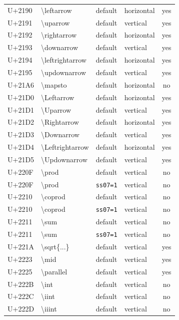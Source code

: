 \documentclass[10pt]{article}
\newcommand\feat[1]{\texttt{#1}}
\begin{document}
\begin{longtable}{>{\ttfamily}l>{\ttfamily}lllc}
U+2190 & \textbackslash{}leftarrow & default & horizontal & yes \\
U+2191 & \textbackslash{}uparrow & default & vertical & yes \\
U+2192 & \textbackslash{}rightarrow & default & horizontal & yes \\
U+2193 & \textbackslash{}downarrow & default & vertical & yes \\
U+2194 & \textbackslash{}leftrightarrow & default & horizontal & yes \\
U+2195 & \textbackslash{}updownarrow & default & vertical & yes \\
U+21A6 & \textbackslash{}mapsto & default & horizontal & no \\
U+21D0 & \textbackslash{}Leftarrow & default & horizontal & yes \\
U+21D1 & \textbackslash{}Uparrow & default & vertical & yes \\
U+21D2 & \textbackslash{}Rightarrow & default & horizontal & yes \\
U+21D3 & \textbackslash{}Downarrow & default & vertical & yes \\
U+21D4 & \textbackslash{}Leftrightarrow & default & horizontal & yes \\
U+21D5 & \textbackslash{}Updownarrow & default & vertical & yes \\
U+220F & \textbackslash{}prod & default & vertical & no \\
U+220F & \textbackslash{}prod & \feat{ss07=1} & vertical & no \\
U+2210 & \textbackslash{}coprod & default & vertical & no \\
U+2210 & \textbackslash{}coprod & \feat{ss07=1} & vertical & no \\
U+2211 & \textbackslash{}sum & default & vertical & no \\
U+2211 & \textbackslash{}sum & \feat{ss07=1} & vertical & no \\
U+221A & \textbackslash{}sqrt\{...\} & default & vertical & yes \\
U+2223 & \textbackslash{}mid & default & vertical & yes \\
U+2225 & \textbackslash{}parallel & default & vertical & yes \\
U+222B & \textbackslash{}int & default & vertical & no \\
U+222C & \textbackslash{}iint & default & vertical & no \\
U+222D & \textbackslash{}iiint & default & vertical & no \\

\end{longtable}
\end{document}
